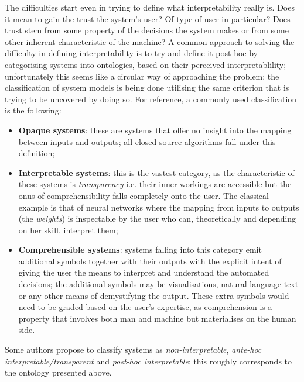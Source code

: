 The difficulties start even in trying to define what interpretability really is.   Does it mean to gain the trust the system's user?  Of type of user in particular?  Does trust stem from some property of the decisions the system makes or from some other inherent characteristic of the machine?
A common approach to solving the difficulty in defining interpretability is to try and define it post-hoc by categorising systems into  ontologies, based on their perceived interpretablility; unfortunately this seems like a circular way of approaching the problem: the classification of system models is being done utilising the same criterion that is trying to be uncovered by doing so.
For reference, a commonly used classification is the following: 
\begin{itemize}
	\item \textbf{Opaque systems}: these are systems that offer no insight into the mapping between  inputs and outputs; all closed-source algorithms fall under this definition;
	\item \textbf{Interpretable systems}: this is the vastest category, as the characteristic of these systems is \textit{transparency} i.e. their inner workings are accessible but the onus of comprehensibility falls completely onto the user.  The classical example is that of neural networks where the mapping from inputs to outputs (the \textit{weights}) is inspectable by the user who can, theoretically and depending on her skill, interpret them;
	\item \textbf{Comprehensible systems}: systems falling into this category emit additional symbols together with their outputs with the explicit intent of giving the user the means to interpret and understand the automated decisions; the additional symbols may be visualisations, natural-language text or any other means of demystifying the output.  These extra symbols would need to be graded based on the user's expertise, as comprehension is a property that involves both man and machine but materialises on the human side.
\end{itemize}
 Some authors propose to classify systems as \textit{non-interpretable}, \textit{ante-hoc interpretable/transparent} and \textit{post-hoc interpretable}; this roughly corresponds to the ontology presented above.

